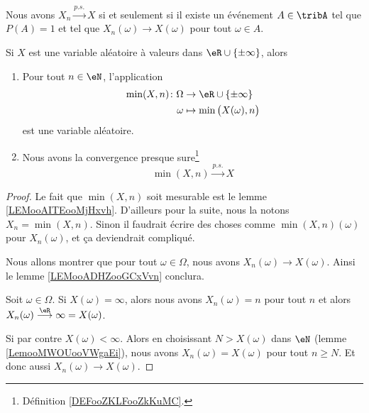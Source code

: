 \begin{lemma}       \label{LEMooADHZooGCxVvn}
	Nous avons \( X_n\stackrel{p.s.}{\longrightarrow}X\) si et seulement si il existe un événement \( A\in\tribA\) tel que \( P(A)=1\) et tel que \( X_n(\omega)\to X(\omega)\) pour tout \( \omega\in A\).
\end{lemma}

\begin{lemma}       \label{LEMooNTNIooKbLwgX}
	Si \( X\) est une variable aléatoire à valeurs dans \( \eR\cup\{ \pm\infty \}\), alors
	\begin{enumerate}
		\item
		      Pour tout \( n\in \eN\), l'application
		      \begin{equation}
			      \begin{aligned}
				      \min(X,n)\colon \Omega & \to \eR\cup\{ \pm\infty \}          \\
				      \omega                 & \mapsto \min\big( X(\omega),n \big)
			      \end{aligned}
		      \end{equation}
		      est une variable aléatoire.
		\item
		      Nous avons la convergence presque sure\footnote{Définition \ref{DEFooZKLFooZkKuMC}.}
		      \begin{equation}
			      \min(X,n)\stackrel{p.s.}{\longrightarrow}X
		      \end{equation}
	\end{enumerate}
\end{lemma}

\begin{proof}
	Le fait que \( \min(X,n)\) soit mesurable est le lemme \ref{LEMooAITEooMjHxvh}. D'ailleurs pour la suite, nous la notons \( X_n=\min(X,n)\). Sinon il faudrait écrire des choses comme \( \min(X,n)(\omega)\) pour \( X_n(\omega)\), et ça deviendrait compliqué.

	Nous allons montrer que pour tout \( \omega\in \Omega\), nous avons \( X_n(\omega)\to X(\omega)\). Ainsi le lemme \ref{LEMooADHZooGCxVvn} conclura.

	Soit \( \omega\in\Omega\). Si \( X(\omega)=\infty\), alors nous avons \( X_n(\omega)=n\) pour tout \( n\) et alors \( X_n(\omega)\stackrel{\eR}{\longrightarrow}\infty=X(\omega)\).

	Si par contre \( X(\omega)<\infty\). Alors en choisissant \( N>X(\omega)\) dans \( \eN\) (lemme \ref{LemooMWOUooVWgaEi}), nous avons \( X_n(\omega)=X(\omega)\) pour tout \( n\geq N\). Et donc aussi \( X_n(\omega)\to X(\omega)\).
\end{proof}

